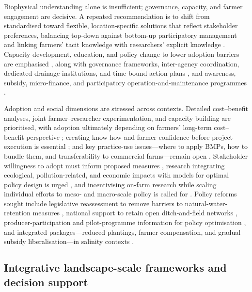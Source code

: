 \documentclass[11pt]{article}
\begin{document}
Biophysical understanding alone is insufficient; governance, capacity, and
farmer engagement are decisive. A repeated recommendation is to shift from
standardised toward flexible, location-specific solutions that reflect
stakeholder preferences, balancing top-down against bottom-up participatory
management and linking farmers' tacit knowledge with researchers' explicit
knowledge \parencite{Ritzema2011,Ritzema2016,Ritzema2023}. Capacity development,
education, and policy change to lower adoption barriers are emphasised
\parencite{Castellano2019,SHIRMOHAMMADI1995,Kesicka2023b}, along with governance
frameworks, inter-agency coordination, dedicated drainage institutions, and
time-bound action plans
\parencite{Singh2019c,Qureshi2008,Gopalakrishnan2007,Ritzema2008b,Valipour2014,Quinn2009},
and awareness, subsidy, micro-finance, and participatory
operation-and-maintenance programmes
\parencite{Satyanarayana2007,Manjunatha2004,BenAissa2013,MCFARLANE1992}.

Adoption and social dimensions are stressed across contexts. Detailed
cost--benefit analyses, joint farmer--researcher experimentation, and capacity
building are prioritised, with adoption ultimately depending on farmers'
long-term cost--benefit perspective \parencite{Okwany2016}; creating know-how and
farmer confidence before project execution is essential \parencite{Ghumman2011};
and key practice-use issues---where to apply BMPs, how to bundle them, and
transferability to commercial farms---remain open \parencite{Ward2018}.
Stakeholder willingness to adopt must inform proposed measures
\parencite{Cuevas2019}, research integrating ecological, pollution-related, and
economic impacts with models for optimal policy design is urged
\parencite{Saikkonen2014}, and incentivising on-farm research while scaling
individual efforts to meso- and macro-scale policy is called for
\parencite{David2015}. Policy reforms sought include legislative reassessment to
remove barriers to natural-water-retention measures \parencite{Kvítek2023},
national support to retain open ditch-and-field networks \parencite{Marja2013},
producer-participation and pilot-programme information for policy optimisation
\parencite{Malone2023}, and integrated packages---reduced plantings, farmer
compensation, and gradual subsidy liberalisation---in salinity contexts
\parencite{Kotb2000}.

\subsection{Integrative landscape-scale frameworks and decision support}
\end{document}
